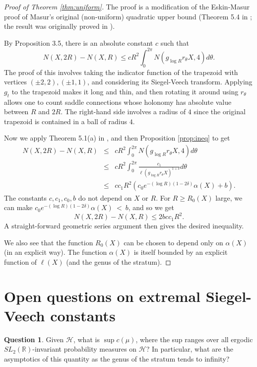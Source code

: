 \documentclass{article}
\theoremstyle{definition}
\newtheorem{question}{Question}[section]
\begin{document}
\begin{proof}[Proof of Theorem \ref{thm:uniform}]
The proof is a modification of the Eskin-Masur proof of Masur's original (non-uniform) quadratic upper bound (Theorem 5.4 in \cite{em2001}; the result was originally proved in \cite{masur1990}). 

By \cite{em2001} Proposition 3.5, there is an absolute constant $c$ such that 
$$N(X,2R)-N(X,R) \le c R^2 \int_0^{2\pi} N(g_{\log R}r_{\theta}X,4)d\theta.$$
The proof of this involves taking the indicator function of the trapezoid with vertices $(\pm 2,2), (\pm 1,1)$, and considering its Siegel-Veech transform.  Applying $g_t$ to the trapezoid makes it long and thin, and then rotating it around using $r_{\theta}$ allows one to count saddle connections whose holonomy has absolute value between $R$ and $2R$.  The right-hand side involves a radius of $4$ since the original trapezoid is contained in a ball of radius $4$.

Now we apply Theorem 5.1(a) in \cite{em2001}, and then Proposition \ref{prop:ineq} to get
  \begin{eqnarray*}
    N(X,2R)-N(X,R) &\le & c R^2 \int_0^{2\pi} N(g_{\log R}r_{\theta} X, 4) d\theta \\
&\le & c R^2 \int_0^{2\pi} \frac{c_1}{\ell(g_{\log R} r_\theta X)^{1+\delta}} d\theta \\
&\le & c c_1 R^2 \left(c_0e^{-(\log R)(1-2\delta)} \alpha(X) + b\right).
  \end{eqnarray*}
The constants $c, c_1,c_0,b$ do not depend on $X$ or $R$.   For $R\ge R_0(X)$ large, we can make $c_0e^{-(\log R )(1-2\delta)}\alpha(X) ~< ~b$, and so we get 
$$N(X,2R) - N(X,R) \le 2bcc_1 R^2.$$  A straight-forward geometric series argument then gives the desired inequality.    

We also see that the function $R_0(X)$ can be chosen to depend only on $\alpha(X)$ (in an explicit way).  The function $\alpha(X)$ is itself bounded by an explicit function of $\ell(X)$ (and the genus of the stratum).  
\end{proof}



\section{Open questions on extremal Siegel-Veech constants}
\label{sec:bound}

\begin{question}
  Given $\mathcal{H}$, what is $\sup c(\mu)$, where the sup ranges over all ergodic $SL_2(\mathbb{R})$-invariant probability measures on $\mathcal{H}$?  In particular, what are the asymptotics of this quantity as the genus of the stratum tends to infinity?  
\end{question}
\end{document}
